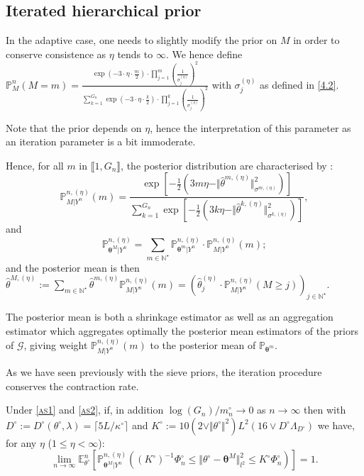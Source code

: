\subsection{Iterated hierarchical prior}\label{4.3}

In the adaptive case, one needs to slightly modify the prior on $M$ in order to conserve consistence as $\eta$ tends to $\infty$.
We hence define $\mathds{P}_{M}^{n}(M = m) = \frac{\exp\left(-3 \cdot \eta \cdot \frac{m}{2} \right) \cdot \prod\limits_{j = 1}^{m} \left(\frac{1}{\sigma_{j}^{(\eta)}}\right)^{2}}{\sum\limits_{k =1}^{G_{n}} \exp\left(-3 \cdot \eta \cdot \frac{k}{2} \right) \cdot \prod\limits_{j = 1}^{k} \left(\frac{1}{\sigma_{j}^{(\eta)}}\right)^{2}}$ with $\sigma_{j}^{(\eta)}$ as defined in \textsc{\cref{4.2}}.

Note that the prior depends on $\eta$, hence the interpretation of this parameter as an iteration parameter is a bit immoderate.

Hence, for all $m$ in $\llbracket 1, G_{n} \rrbracket$, the posterior distribution are characterised by :
\[\mathds{P}_{M \vert Y^{n}}^{n, (\eta)}(m) = \frac{\exp\!\!\left[- \frac{1}{2} \left( 3 m \eta - \Vert \widehat{\theta}^{m, (\eta)} \Vert_{\sigma^{m, (\eta)}}^{2} \right)\right] }{\sum\limits_{k = 1}^{G_{n}} \exp\!\!\left[ - \frac{1}{2} \left( 3 k \eta - \Vert \widehat{\theta}^{k, (\eta)} \Vert_{\sigma^{k, (\eta)}}^{2}\right) \right]},\]
and
\[\mathds{P}_{\boldsymbol{\theta}^{M} \vert Y^{n}}^{n, (\eta)} = \sum\limits_{m \in \mathds{N}^{\star}}\mathds{P}_{\boldsymbol{\theta}^{m} \vert Y^{n}}^{n, (\eta)} \cdot \mathds{P}_{M \vert Y^{n}}^{n, (\eta)}(m);\]
and the posterior mean is then $\widehat{\theta}^{M, (\eta)} :=  \sum\limits_{m \in \mathds{N}^{\star}} \widehat{\theta}^{m, (\eta)} \mathds{P}_{M \vert Y^{n}}^{n, (\eta)}(m) = \left(\widehat{\theta}_{j}^{(\eta)} \cdot \mathds{P}_{M \vert Y^{n}}^{n, (\eta)} \left(M \geq j\right)\right)_{j \in \mathds{N}^{\star}}.$

The posterior mean is both a shrinkage estimator as well as an aggregation estimator which aggregates optimally the posterior mean estimators of the priors of $\mathcal{G}$, giving weight $\mathds{P}_{M \vert Y^{n}}^{n, (\eta)}(m)$ to the posterior mean of $\mathds{P}_{\boldsymbol{\theta}^{m}}$.

As we have seen previously with the sieve priors, the iteration procedure conserves the contraction rate.

\begin{cor}\label{cor3}
Under \textsc{\cref{as1}} and \textsc{\cref{as2}}, if, in addition $\log(G_{n})/m_{n}^{\circ} \rightarrow 0$ as $n \rightarrow \infty$ then with $D^{\circ} := D^{\circ}(\theta^{\circ}, \lambda) = \lceil 5 L/\kappa^{\circ} \rceil$ and $K^{\circ} := 10(2 \vee \Vert \theta^{\circ} \Vert^{2})L^{2}(16 \vee D^{\circ} \Lambda_{D^{\circ}})$ we have, for any $\eta$ ($1 \leq \eta < \infty$):
\[\lim\limits_{n \rightarrow \infty} \mathds{E}_{\theta^{\circ}}^{n}\left[\mathds{P}_{\boldsymbol{\theta}^{M} \vert Y^{n}}^{n, (\eta)} \left(\left(K^{\circ}\right)^{-1} \Phi_{n}^{\circ} \leq \Vert \theta^{\circ} - \boldsymbol{\theta}^{M} \Vert_{l^{2}}^{2} \leq K^{\circ} \Phi_{n}^{\circ}\right)\right] = 1.\]
\end{cor}


